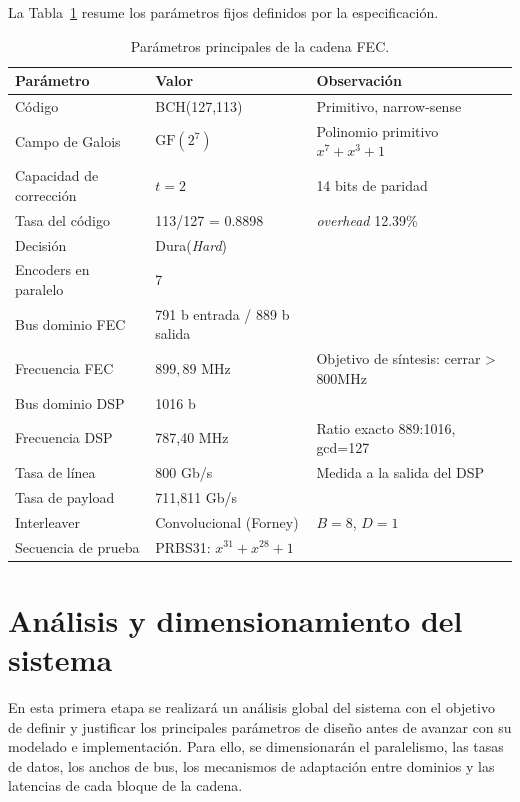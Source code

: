 \documentclass[10pt,a4paper]{article}
\begin{document}
La Tabla~\ref{tab:parametros-sistema} resume los parámetros fijos definidos por la especificación.

\begin{table}[H]
    \centering
    \caption{Parámetros principales de la cadena FEC.}
    \label{tab:parametros-sistema}
    \begin{tabular}{@{}lll@{}}
        \toprule
        \textbf{Parámetro} & \textbf{Valor} & \textbf{Observación}\\
        \midrule
        Código & BCH(127,113) & Primitivo, narrow-sense \\
        Campo de Galois & $\mathrm{GF}(2^7)$ & Polinomio primitivo $x^7+x^3+1$ \\
        Capacidad de corrección & $t=2$ & 14 bits de paridad\\
        Tasa del código & 113/127 = 0.8898 & \textit{overhead} 12.39\% \\
        Decisión & Dura(\textit{Hard}) & \\
        Encoders en paralelo & 7 &  \\
        Bus dominio FEC & 791 b entrada / 889 b salida & \\
        Frecuencia FEC  & $899,89$ MHz & Objetivo de síntesis: cerrar > 800MHz\\
        Bus dominio DSP & 1016 b &  \\
        Frecuencia DSP & 787,40 MHz & Ratio exacto 889:1016, gcd=127\\
        Tasa de línea & 800 Gb/s & Medida a la salida del DSP\\
        Tasa de payload & 711,811 Gb/s & \\
        Interleaver & Convolucional (Forney) & $B=8$, $D=1$ \\
        Secuencia de prueba & PRBS31: $x^{31} + x^{28} + 1$ &  \\
        \bottomrule
    \end{tabular}
\end{table}


\section{Análisis y dimensionamiento del sistema}
\label{sec:etapa-0}

En esta primera etapa se realizará un análisis global del sistema con el objetivo de
definir y justificar los principales parámetros de diseño antes de avanzar con su
modelado e implementación. Para ello, se dimensionarán el paralelismo, las tasas de
datos, los anchos de bus, los mecanismos de adaptación entre dominios y las latencias
de cada bloque de la cadena.
\end{document}
